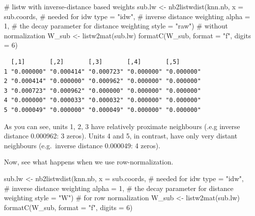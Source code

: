 \documentclass[
  letterpaper,
  DIV=11,
  numbers=noendperiod]{scrreprt}
\newenvironment{Shaded}{\begin{snugshade}}{\end{snugshade}}
\newcommand{\AttributeTok}[1]{\textcolor[rgb]{0.40,0.45,0.13}{#1}}
\newcommand{\CommentTok}[1]{\textcolor[rgb]{0.37,0.37,0.37}{#1}}
\newcommand{\DecValTok}[1]{\textcolor[rgb]{0.68,0.00,0.00}{#1}}
\newcommand{\FunctionTok}[1]{\textcolor[rgb]{0.28,0.35,0.67}{#1}}
\newcommand{\NormalTok}[1]{\textcolor[rgb]{0.00,0.23,0.31}{#1}}
\newcommand{\OtherTok}[1]{\textcolor[rgb]{0.00,0.23,0.31}{#1}}
\newcommand{\StringTok}[1]{\textcolor[rgb]{0.13,0.47,0.30}{#1}}
\begin{document}
\begin{Shaded}
\begin{Highlighting}[]
\CommentTok{\# listw with inverse{-}distance based weights}
\NormalTok{sub.lw }\OtherTok{\textless{}{-}} \FunctionTok{nb2listwdist}\NormalTok{(knn.nb,}
                       \AttributeTok{x =}\NormalTok{ sub.coords, }\CommentTok{\# needed for idw}
                       \AttributeTok{type =} \StringTok{"idw"}\NormalTok{, }\CommentTok{\# inverse distance weighting}
                       \AttributeTok{alpha =} \DecValTok{1}\NormalTok{, }\CommentTok{\# the decay parameter for distance weighting}
                       \AttributeTok{style =} \StringTok{"raw"}\NormalTok{) }\CommentTok{\# without normalization}
\NormalTok{W\_sub }\OtherTok{\textless{}{-}} \FunctionTok{listw2mat}\NormalTok{(sub.lw)}
\FunctionTok{formatC}\NormalTok{(W\_sub, }\AttributeTok{format =} \StringTok{"f"}\NormalTok{, }\AttributeTok{digits =} \DecValTok{6}\NormalTok{)}
\end{Highlighting}
\end{Shaded}

\begin{verbatim}
  [,1]       [,2]       [,3]       [,4]       [,5]      
1 "0.000000" "0.000414" "0.000723" "0.000000" "0.000000"
2 "0.000414" "0.000000" "0.000962" "0.000000" "0.000000"
3 "0.000723" "0.000962" "0.000000" "0.000000" "0.000000"
4 "0.000000" "0.000033" "0.000032" "0.000000" "0.000000"
5 "0.000049" "0.000000" "0.000049" "0.000000" "0.000000"
\end{verbatim}

As you can see, units 1, 2, 3 have relatively proximate neighbours (.e.g
inverse distance 0.000962: 3 zeros). Units 4 and 5, in contrast, have
only very distant neighbours (e.g.~inverse distance 0.000049: 4 zeros).

Now, see what happens when we use row-normalization.

\begin{Shaded}
\begin{Highlighting}[]
\NormalTok{sub.lw }\OtherTok{\textless{}{-}} \FunctionTok{nb2listwdist}\NormalTok{(knn.nb,}
                       \AttributeTok{x =}\NormalTok{ sub.coords, }\CommentTok{\# needed for idw}
                       \AttributeTok{type =} \StringTok{"idw"}\NormalTok{, }\CommentTok{\# inverse distance weighting}
                       \AttributeTok{alpha =} \DecValTok{1}\NormalTok{, }\CommentTok{\# the decay parameter for distance weighting}
                       \AttributeTok{style =} \StringTok{"W"}\NormalTok{) }\CommentTok{\# for row normalization}
\NormalTok{W\_sub }\OtherTok{\textless{}{-}} \FunctionTok{listw2mat}\NormalTok{(sub.lw)}
\FunctionTok{formatC}\NormalTok{(W\_sub, }\AttributeTok{format =} \StringTok{"f"}\NormalTok{, }\AttributeTok{digits =} \DecValTok{6}\NormalTok{)}
\end{Highlighting}
\end{Shaded}
\end{document}
